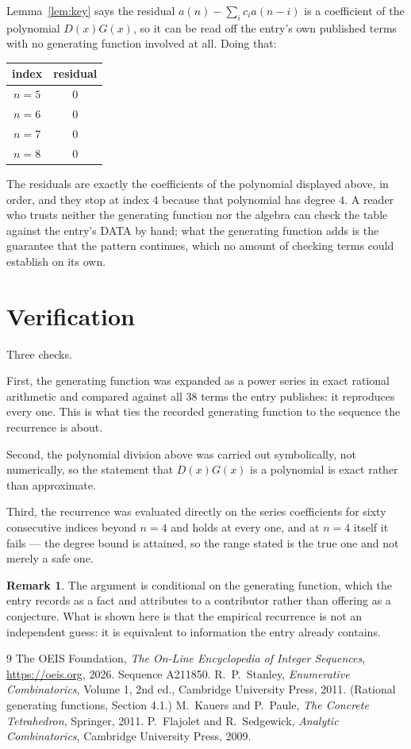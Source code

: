 \documentclass[11pt,a4paper]{article}
\theoremstyle{plain}
\theoremstyle{definition}
\newtheorem{remark}[theorem]{Remark}
\begin{document}
Lemma~\ref{lem:key} says the residual $a(n)-\sum_ic_ia(n-i)$ is a coefficient of the
polynomial $D(x)G(x)$, so it can be read off the entry's own published terms with no
generating function involved at all. Doing that:
\begin{center}
\begin{tabular}{cc}
index & residual \\ \hline
$n=5$ & $0$ \\
$n=6$ & $0$ \\
$n=7$ & $0$ \\
$n=8$ & $0$
\end{tabular}
\end{center}
The residuals are exactly the coefficients of the polynomial displayed above, in order, and
they stop at index $4$ because that polynomial has degree $4$. A reader who trusts
neither the generating function nor the algebra can check the table against the entry's DATA
by hand; what the generating function adds is the guarantee that the pattern continues, which
no amount of checking terms could establish on its own.

\section{Verification}

Three checks.

First, the generating function was expanded as a power series in exact rational arithmetic and
compared against all $38$ terms the entry publishes: it reproduces every one. This is
what ties the recorded generating function to the sequence the recurrence is about.

Second, the polynomial division above was carried out symbolically, not numerically, so the
statement that $D(x)G(x)$ is a polynomial is exact rather than approximate.

Third, the recurrence was evaluated directly on the series coefficients for sixty consecutive
indices beyond $n=4$ and holds at every one, and at $n=4$ itself it fails --- the
degree bound is attained, so the range stated is the true one and not merely a safe one.

\begin{remark}
The argument is conditional on the generating function, which the entry records as a fact and
attributes to a contributor rather than offering as a conjecture. What is shown here is that
the empirical recurrence is not an independent guess: it is equivalent to information the
entry already contains.
\end{remark}

\begin{thebibliography}{9}
 The OEIS Foundation, \emph{The On-Line Encyclopedia of Integer
Sequences}, \url{https://oeis.org}, 2026. Sequence A211850.
 R.~P.~Stanley, \emph{Enumerative Combinatorics}, Volume 1, 2nd ed.,
Cambridge University Press, 2011. (Rational generating functions, Section 4.1.)
 M.~Kauers and P.~Paule, \emph{The Concrete Tetrahedron}, Springer, 2011.
 P.~Flajolet and R.~Sedgewick, \emph{Analytic Combinatorics}, Cambridge
University Press, 2009.
\end{thebibliography}
\end{document}
